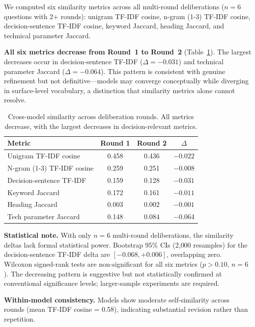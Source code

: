 \documentclass[11pt,a4paper]{article}
\begin{document}
We computed six similarity metrics across all multi-round deliberations ($n = 6$ questions with 2+ rounds): unigram TF-IDF cosine, n-gram (1-3) TF-IDF cosine, decision-sentence TF-IDF cosine, keyword Jaccard, heading Jaccard, and technical parameter Jaccard.

\textbf{All six metrics decrease from Round~1 to Round~2} (Table~\ref{tab:similarity}). The largest decreases occur in decision-sentence TF-IDF ($\Delta = -0.031$) and technical parameter Jaccard ($\Delta = -0.064$). This pattern is consistent with genuine refinement but not definitive---models may converge conceptually while diverging in surface-level vocabulary, a distinction that similarity metrics alone cannot resolve.

\begin{table}[t]
\centering
\caption{Cross-model similarity across deliberation rounds. All metrics decrease, with the largest decreases in decision-relevant metrics.}
\label{tab:similarity}
\begin{tabular}{lccc}
\toprule
Metric & Round 1 & Round 2 & $\Delta$ \\
\midrule
Unigram TF-IDF cosine & 0.458 & 0.436 & $-0.022$ \\
N-gram (1-3) TF-IDF cosine & 0.259 & 0.251 & $-0.008$ \\
Decision-sentence TF-IDF & 0.159 & 0.128 & $-0.031$ \\
Keyword Jaccard & 0.172 & 0.161 & $-0.011$ \\
Heading Jaccard & 0.003 & 0.002 & $-0.001$ \\
Tech parameter Jaccard & 0.148 & 0.084 & $-0.064$ \\
\bottomrule
\end{tabular}
\end{table}

\textbf{Statistical note.} With only $n = 6$ multi-round deliberations, the similarity deltas lack formal statistical power. Bootstrap 95\% CIs (2{,}000 resamples) for the decision-sentence TF-IDF delta are $[-0.068, +0.006]$, overlapping zero. Wilcoxon signed-rank tests are non-significant for all six metrics ($p > 0.10$, $n = 6$). The decreasing pattern is suggestive but not statistically confirmed at conventional significance levels; larger-sample experiments are required.

\textbf{Within-model consistency.} Models show moderate self-similarity across rounds (mean TF-IDF cosine = 0.58), indicating substantial revision rather than repetition.
\end{document}
